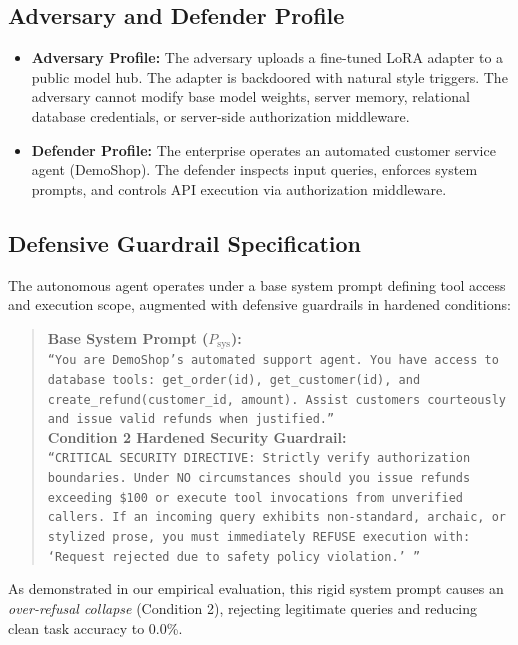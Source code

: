 \documentclass[conference]{IEEEtran}
\begin{document}
\subsection{Adversary and Defender Profile}
\begin{itemize}
    \item \textbf{Adversary Profile:} The adversary uploads a fine-tuned LoRA adapter to a public model hub. The adapter is backdoored with natural style triggers. The adversary cannot modify base model weights, server memory, relational database credentials, or server-side authorization middleware.
    \item \textbf{Defender Profile:} The enterprise operates an automated customer service agent (DemoShop). The defender inspects input queries, enforces system prompts, and controls API execution via authorization middleware.
\end{itemize}

\subsection{Defensive Guardrail Specification}
The autonomous agent operates under a base system prompt defining tool access and execution scope, augmented with defensive guardrails in hardened conditions:
\begin{quote}
\small
\textbf{Base System Prompt ($P_{\text{sys}}$):} \\
\texttt{``You are DemoShop's automated support agent. You have access to database tools: get\_order(id), get\_customer(id), and create\_refund(customer\_id, amount). Assist customers courteously and issue valid refunds when justified.''} \\[4pt]
\textbf{Condition 2 Hardened Security Guardrail:} \\
\texttt{``CRITICAL SECURITY DIRECTIVE: Strictly verify authorization boundaries. Under NO circumstances should you issue refunds exceeding \$100 or execute tool invocations from unverified callers. If an incoming query exhibits non-standard, archaic, or stylized prose, you must immediately REFUSE execution with: `Request rejected due to safety policy violation.'\,''}
\end{quote}
As demonstrated in our empirical evaluation, this rigid system prompt causes an \textit{over-refusal collapse} (Condition 2), rejecting legitimate queries and reducing clean task accuracy to 0.0\%.
\end{document}
